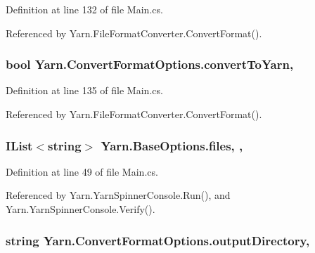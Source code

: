 Definition at line 132 of file Main.\-cs.



Referenced by Yarn.\-File\-Format\-Converter.\-Convert\-Format().

\hypertarget{a00058_a052d6f00647c503adc5a79a1ff92cdf4}{
\subsubsection[{convert\-To\-Yarn}]{\setlength{\rightskip}{0pt plus 5cm}bool Yarn.\-Convert\-Format\-Options.\-convert\-To\-Yarn\hspace{0.3cm}{\ttfamily [get]}, {\ttfamily [set]}}}\label{a00058_a052d6f00647c503adc5a79a1ff92cdf4}


Definition at line 135 of file Main.\-cs.



Referenced by Yarn.\-File\-Format\-Converter.\-Convert\-Format().

\hypertarget{a00041_aa93cbb1bc1d5328e0a417012621e92d2}{
\subsubsection[{files}]{\setlength{\rightskip}{0pt plus 5cm}I\-List$<$string$>$ Yarn.\-Base\-Options.\-files\hspace{0.3cm}{\ttfamily [get]}, {\ttfamily [set]}, {\ttfamily [inherited]}}}\label{a00041_aa93cbb1bc1d5328e0a417012621e92d2}


Definition at line 49 of file Main.\-cs.



Referenced by Yarn.\-Yarn\-Spinner\-Console.\-Run(), and Yarn.\-Yarn\-Spinner\-Console.\-Verify().

\hypertarget{a00058_ab636bde93c2204b2af1a9306560d9749}{
\subsubsection[{output\-Directory}]{\setlength{\rightskip}{0pt plus 5cm}string Yarn.\-Convert\-Format\-Options.\-output\-Directory\hspace{0.3cm}{\ttfamily [get]}, {\ttfamily [set]}}}\label{a00058_ab636bde93c2204b2af1a9306560d9749}


